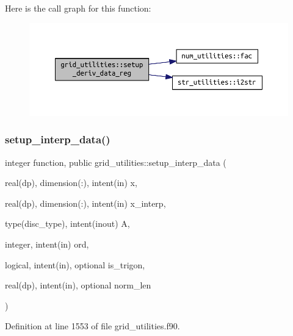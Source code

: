 Here is the call graph for this function\+:
\nopagebreak
\begin{figure}[H]
\begin{center}
\leavevmode
\includegraphics[width=350pt]{namespacegrid__utilities_a383fb7484b5a315a3b8019d388f88617_cgraph}
\end{center}
\end{figure}
\mbox{\label{namespacegrid__utilities_a43206328f85253a6cc821cd46a498bb6}} 
\subsubsection{\texorpdfstring{setup\+\_\+interp\+\_\+data()}{setup\_interp\_data()}}
{\footnotesize\ttfamily integer function, public grid\+\_\+utilities\+::setup\+\_\+interp\+\_\+data (\begin{DoxyParamCaption}\item[{real(dp), dimension(\+:), intent(in)}]{x,  }\item[{real(dp), dimension(\+:), intent(in)}]{x\+\_\+interp,  }\item[{type(disc\+\_\+type), intent(inout)}]{A,  }\item[{integer, intent(in)}]{ord,  }\item[{logical, intent(in), optional}]{is\+\_\+trigon,  }\item[{real(dp), intent(in), optional}]{norm\+\_\+len }\end{DoxyParamCaption})}



Definition at line 1553 of file grid\+\_\+utilities.\+f90.

